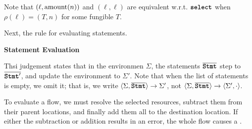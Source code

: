 \documentclass[nonacm, dvipsnames, sigconf]{acmart}
\begin{document}
Note that $(\ell, \amount(n))$ and $(\ell, \ell)$ are equivalent w.r.t. $\select$ when $\rho(\ell) = (T, n)$ for some fungible $T$.

\begin{mathpar}




\end{mathpar}

Next, the rule for evaluating statements.

 \textbf{Statement Evaluation}

Thsi judgement states that in the environmen $\Sigma$, the statements $\overline{\Stmt}$ step to $\overline{\Stmt'}$, and update the environment to $\Sigma'$.
Note that when the list of statements is empty, we omit it; that is, we write $\angles{\Sigma, \overline{\Stmt}} \to \Sigma'$, not $\angles{\Sigma, \overline{\Stmt}} \to \angles{\Sigma', \cdot}$.

To evaluate a flow, we must resolve the selected resources, subtract them from their parent locations, and finally add them all to the destination location.
If either the subtraction or addition results in an error, the whole flow causes a \revert.

\begin{mathpar}

\end{mathpar}
\end{document}
